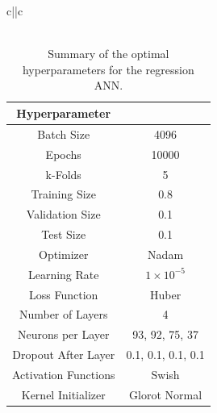 \begin{table}
\centering
  \begin{tabular}{c||c}
  \hline
   \\
  \hline
   \\
  \hline
  \end{tabular}
  \caption{Input variables used for training regression ANN to predict \ptv{}.}\label{tab:regression_network_inputs}
\end{table}

\begin{table}[htp]
\centering
  \begin{tabular}{c|c}
    \hline
    \textbf{Hyperparameter} & \zdom{} \\
    \hline
    \hline
    Batch Size & 4096 \\
    Epochs & 10000 \\
    k-Folds & 5 \\
    Training Size & 0.8 \\
    Validation Size & 0.1 \\
    Test Size & 0.1 \\
    Optimizer & Nadam \\
    Learning Rate & $1 \times 10^{-5}$ \\
    Loss Function & Huber \\
    Number of Layers & 4 \\
    Neurons per Layer & 93, 92, 75, 37 \\
    Dropout After Layer & 0.1, 0.1, 0.1, 0.1 \\
    Activation Functions & Swish \\
    Kernel Initializer & Glorot Normal \\
  \end{tabular}
  \caption{Summary of the optimal hyperparameters for the regression ANN.}\label{tab:regression_network_architecture}
\end{table}

